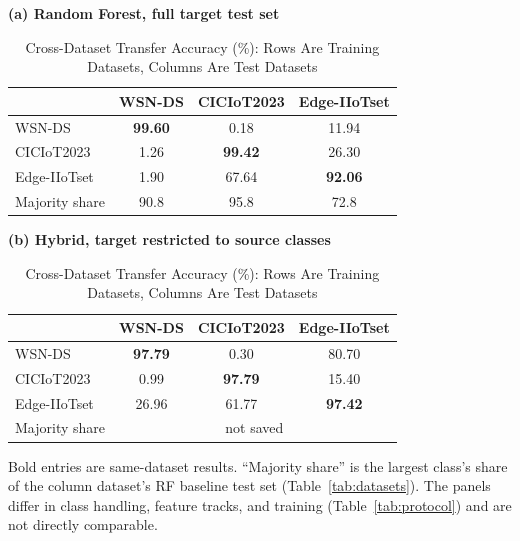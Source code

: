 \documentclass[conference]{IEEEtran}
\begin{document}
\begin{table}[t]
\caption{Cross-Dataset Transfer Accuracy (\%): Rows Are Training Datasets, Columns Are Test Datasets}
\label{tab:transfer}
\centering
\footnotesize
\setlength{\tabcolsep}{5pt}
\begin{minipage}[t]{0.47\textwidth}
\centering
\textbf{(a) Random Forest, full target test set}\\[2pt]
\begin{tabular}{|l|c|c|c|}
\hline
 & \textbf{WSN-DS} & \textbf{CICIoT2023} & \textbf{Edge-IIoTset} \\
\hline
WSN-DS & \textbf{99.60} & 0.18 & 11.94 \\
\hline
CICIoT2023 & 1.26 & \textbf{99.42} & 26.30 \\
\hline
Edge-IIoTset & 1.90 & 67.64 & \textbf{92.06} \\
\hline
Majority share & 90.8 & 95.8 & 72.8 \\
\hline
\end{tabular}
\end{minipage}\hfill
\begin{minipage}[t]{0.47\textwidth}
\centering
\textbf{(b) Hybrid, target restricted to source classes}\\[2pt]
\begin{tabular}{|l|c|c|c|}
\hline
 & \textbf{WSN-DS} & \textbf{CICIoT2023} & \textbf{Edge-IIoTset} \\
\hline
WSN-DS & \textbf{97.79} & 0.30 & 80.70 \\
\hline
CICIoT2023 & 0.99 & \textbf{97.79} & 15.40 \\
\hline
Edge-IIoTset & 26.96 & 61.77 & \textbf{97.42} \\
\hline
Majority share & \multicolumn{3}{c|}{not saved} \\
\hline
\end{tabular}
\end{minipage}

\vspace{3pt}
\parbox{0.96\textwidth}{\footnotesize Bold entries are same-dataset results. ``Majority share'' is the largest class's share of the column dataset's RF baseline test set (Table~\ref{tab:datasets}). The panels differ in class handling, feature tracks, and training (Table~\ref{tab:protocol}) and are not directly comparable.}
\end{table}
\end{document}
